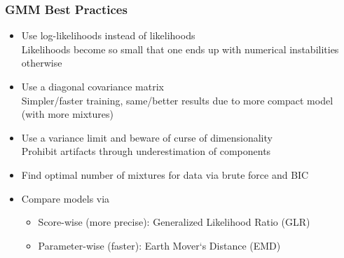 \documentclass[11pt]{article}
\theoremstyle{definition}
\begin{document}
\subsubsection{GMM Best Practices}
\begin{itemize}
	\item Use log-likelihoods instead of likelihoods\\
	Likelihoods become so small that one ends up with numerical instabilities otherwise
	\item Use a diagonal covariance matrix\\
	Simpler/faster training, same/better results due to more compact model (with more mixtures)
	\item Use a variance limit and beware of curse of dimensionality\\
	Prohibit artifacts through underestimation of components
	\item Find optimal number of mixtures for data via brute force and BIC
	\item Compare models via
	\begin{itemize}
		\item Score-wise (more precise): Generalized Likelihood Ratio (GLR)
		\item Parameter-wise (faster): Earth Mover‘s Distance (EMD) \parencite{beigi1998distance}
	\end{itemize}
\end{itemize}


\printbibliography
\end{document}

